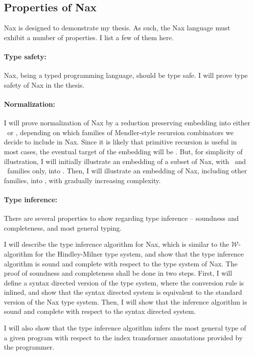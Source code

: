 \subsection{Properties of Nax}\label{sec:Nax:theory}

Nax is designed to demonstrate my thesis. As such, the Nax language must
exhibit a number of properties. I list a few of them here.

\paragraph{Type safety:}
Nax, being a typed programming language, should be type safe.
I will prove type safety of Nax in the thesis.

\paragraph{Normalization:}
I will prove normalization of Nax by a reduction preserving embedding into
either \Fi\ or \Fixw, depending on which families of Mendler-style recursion
combinators we decide to include in Nax. Since it is likely that 
primitive recursion is useful in most cases, the eventual target of
the embedding will be \Fixw. But, for simplicity of illustration, I will
initially illustrate an embedding of a subset of Nax, with \MIt\ and \MsfIt\
families only, into \Fi. Then, I will illustrate an embedding of Nax,
including other families, into \Fixw, with gradually increasing complexity.

\paragraph{Type inference:}
There are several properties to show regarding type inference --
soundness and completeness, and most general typing.

I will describe the type inference algorithm for Nax, which is similar to
the $\mathcal{W}$-algorithm for the Hindley-Milner type system, and show
that the type inference algorithm is sound and complete with respect to
the type system of Nax. The proof of soundness and completeness shall be
done in two steps. First, I will define a syntax directed version of
the type system, where the conversion rule is inlined, and show that
the syntax directed system is equivalent to the standard version of
the Nax type system. Then, I will show that the inference algorithm is
sound and complete with respect to the syntax directed system.

I will also show that the type inference algorithm infers the most general type
of a given program with respect to the index transformer annotations provided by
the programmer.


